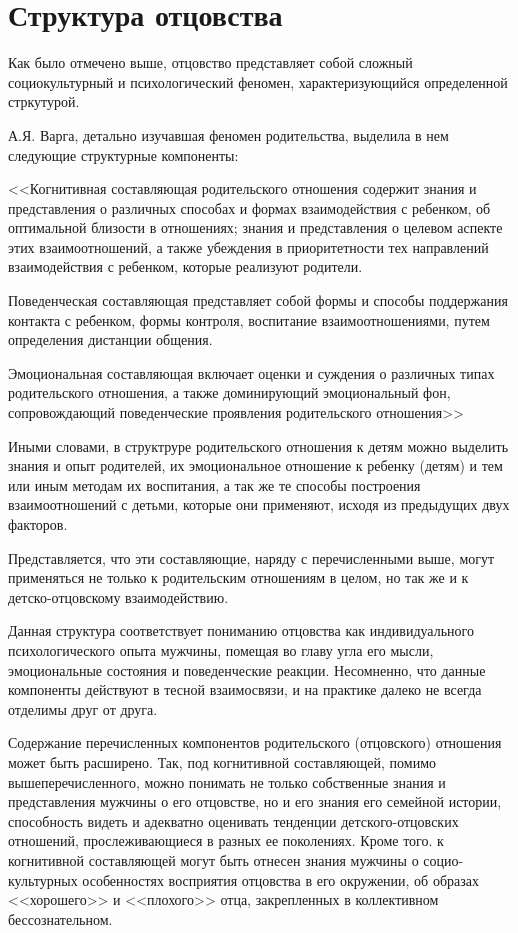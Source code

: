 \documentclass{../../common/thesisbyxetex}
\begin{document}
\section{Структура отцовства}

Как было отмечено выше, отцовство представляет собой сложный  социокультурный и психологический
феномен, характеризующийся определенной стркутурой.

А.Я. Варга, детально изучавшая феномен родительства, выделила в нем следующие структурные
компоненты:

<<Когнитивная составляющая родительского отношения содержит знания и
представления о различных способах и формах взаимодействия с ребенком, об
оптимальной близости в отношениях; знания и представления о целевом аспекте этих
взаимоотношений, а также убеждения в приоритетности тех направлений
взаимодействия с ребенком, которые реализуют родители.

Поведенческая составляющая представляет собой формы и способы поддержания
контакта с ребенком, формы контроля, воспитание взаимоотношениями, путем
определения дистанции общения.

Эмоциональная составляющая включает оценки и суждения о различных типах
родительского отношения, а также доминирующий эмоциональный фон,
сопровождающий поведенческие проявления родительского отношения>> \cite{varga}

Иными словами, в структруре родительского отношения к детям можно выделить знания и опыт родителей,
их эмоциональное отношение к ребенку (детям) и тем или иным методам их воспитания, а так же те
способы построения взаимоотношений с детьми,
которые они применяют, исходя из предыдущих двух факторов.

Представляется, что эти составляющие,
наряду с перечисленными выше, могут применяться не только к родительским отношениям в целом, но
так же и к детско-отцовскому взаимодействию.

Данная структура соответствует пониманию отцовства как индивидуального психологического опыта
мужчины, помещая во главу угла его мысли, эмоциональные состояния и поведенческие реакции.
Несомненно, что данные компоненты действуют в тесной взаимосвязи, и на практике далеко не всегда
отделимы друг от друга.

Содержание перечисленных компонентов родительского (отцовского)
отношения может быть расширено. Так, под когнитивной составляющей, помимо вышеперечисленного, можно
понимать не только собственные знания и представления мужчины о его отцовстве, но и его
знания его семейной истории, способность видеть и адекватно оценивать тенденции детского-отцовских
отношений, прослеживающиеся в разных ее поколениях. Кроме того. к когнитивной составляющей могут
быть отнесен знания мужчины о социо-культурных особенностях восприятия отцовства в его окружении,
об образах <<хорошего>> и  <<плохого>> отца, закрепленных в коллективном
бессознательном.
\end{document}
